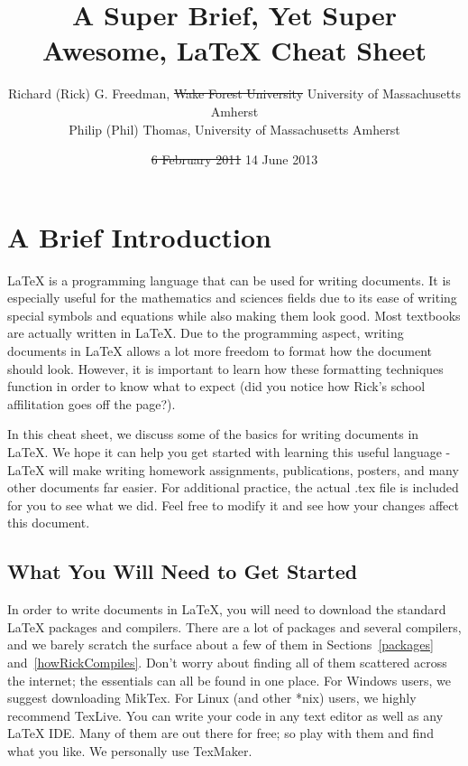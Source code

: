 \documentclass[10pt]{article}
\title{A Super Brief, Yet Super Awesome, LaTeX Cheat Sheet}
\author{Richard (Rick) G. Freedman, \sout{Wake Forest University} University of Massachusetts Amherst\\Philip (Phil) Thomas, University of Massachusetts Amherst}
\date{\sout{6 February 2011} 14 June 2013}
\begin{document}
\maketitle
\tableofcontents

\section{A Brief Introduction\label{intro}}
LaTeX is a programming language that can be used for writing documents.  It is especially useful for the mathematics and sciences fields due to its ease of writing special symbols and equations while also making them look good.  Most textbooks are actually written in LaTeX.  Due to the programming aspect, writing documents in LaTeX allows a lot more freedom to format how the document should look.  However, it is important to learn how these formatting techniques function in order to know what to expect (did you notice how Rick's school affilitation goes off the page?).
\par
In this cheat sheet, we discuss some of the basics for writing documents in LaTeX.  We hope it can help you get started with learning this useful language - LaTeX will make writing homework assignments, publications, posters, and many other documents far easier.  For additional practice, the actual .tex file is included for you to see what we did.  Feel free to modify it and see how your changes affect this document.
\subsection{What You Will Need to Get Started\label{gettingStarted}}
In order to write documents in LaTeX, you will need to download the standard LaTeX packages and compilers.  There are a lot of packages and several compilers, and we barely scratch the surface about a few of them in Sections~\ref{packages} and~\ref{howRickCompiles}.  Don't worry about finding all of them scattered across the internet; the essentials can all be found in one place.  For Windows users, we suggest downloading MikTex.  For Linux (and other *nix) users, we highly recommend TexLive.  You can write your code in any text editor as well as any LaTeX IDE.  Many of them are out there for free; so play with them and find what you like.  We personally use TexMaker.
\end{document}

